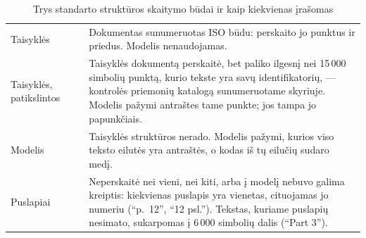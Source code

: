 \begin{table}[H]
\caption{Trys standarto struktūros skaitymo būdai ir kaip kiekvienas įrašomas}\label{tab:corpus:methods}
\begin{tabularx}{\textwidth}{@{}L{22mm}L{30mm}Y@{}}
\toprule
{} &  &  \\
\midrule
Taisyklės &  & Dokumentas sunumeruotas ISO būdu:  perskaito jo punktus ir priedus. Modelis nenaudojamas. \\
Taisyklės, patikslintos &  & Taisyklės dokumentą perskaitė, bet paliko ilgesnį nei 15\,000 simbolių punktą, kurio tekste yra savų identifikatorių, --- kontrolės priemonių katalogą sunumeruotame skyriuje. Modelis pažymi antraštes tame punkte; jos tampa jo papunkčiais. \\
Modelis &  & Taisyklės struktūros nerado. Modelis pažymi, kurios viso teksto eilutės yra antraštės, o kodas iš tų eilučių sudaro medį. \\
Puslapiai &  & Neperskaitė nei vieni, nei kiti, arba į modelį nebuvo galima kreiptis: kiekvienas puslapis yra vienetas, cituojamas jo numeriu (\enquote{p.~12}, \enquote{12 psl.}). Tekstas, kuriame puslapių nesimato, sukarpomas į 6\,000 simbolių dalis (\enquote{Part 3}). \\
\bottomrule
\end{tabularx}
\end{table}

